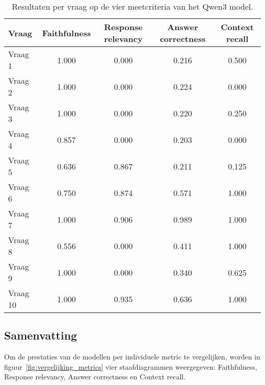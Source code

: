 \begin{table}[H]
    \centering
    \begin{tabular}{|l|c|c|c|c|}
        \hline
        \textbf{Vraag} & \textbf{Faithfulness} & \textbf{Response relevancy} & \textbf{Answer correctness} & \textbf{Context recall} \\
        \hline
        Vraag 1  & 1.000 & 0.000 & 0.216 & 0.500 \\
        Vraag 2  & 1.000 & 0.000 & 0.224 & 0.000 \\
        Vraag 3  & 1.000 & 0.000 & 0.220 & 0.250 \\
        Vraag 4  & 0.857 & 0.000 & 0.203 & 0.000 \\
        Vraag 5  & 0.636 & 0.867 & 0.211 & 0.125 \\
        Vraag 6  & 0.750 & 0.874 & 0.571 & 1.000 \\
        Vraag 7  & 1.000 & 0.906 & 0.989 & 1.000 \\
        Vraag 8  & 0.556 & 0.000 & 0.411 & 1.000 \\
        Vraag 9  & 1.000 & 0.000 & 0.340 & 0.625 \\
        Vraag 10 & 1.000 & 0.935 & 0.636 & 1.000 \\
        \hline
    \end{tabular}
    \caption{Resultaten per vraag op de vier meetcriteria van het Qwen3 model.}
    \label{tab:resultaten_vragen_qwen3}
\end{table}


\subsection{Samenvatting}

Om de prestaties van de modellen per individuele metric te vergelijken, worden in figuur~\ref{fig:vergelijking_metrics} vier staafdiagrammen weergegeven: Faithfulness, Response relevancy, Answer correctness en Context recall.

